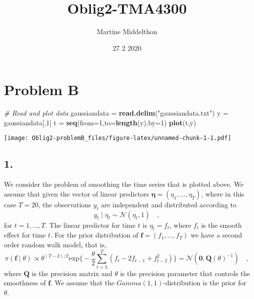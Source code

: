 \documentclass[
]{article}
\title{Oblig2-TMA4300}
\author{Martine Middelthon}
\date{27 2 2020}
\newenvironment{Shaded}{\begin{snugshade}}{\end{snugshade}}
\newcommand{\CommentTok}[1]{\textcolor[rgb]{0.56,0.35,0.01}{\textit{#1}}}
\newcommand{\DataTypeTok}[1]{\textcolor[rgb]{0.13,0.29,0.53}{#1}}
\newcommand{\DecValTok}[1]{\textcolor[rgb]{0.00,0.00,0.81}{#1}}
\newcommand{\KeywordTok}[1]{\textcolor[rgb]{0.13,0.29,0.53}{\textbf{#1}}}
\newcommand{\NormalTok}[1]{#1}
\newcommand{\StringTok}[1]{\textcolor[rgb]{0.31,0.60,0.02}{#1}}
\begin{document}
\maketitle

\hypertarget{problem-b}{%
\section{Problem B}\label{problem-b}}

\begin{Shaded}
\begin{Highlighting}[]
\CommentTok{# Read and plot data}
\NormalTok{gaussiandata =}\StringTok{ }\KeywordTok{read.delim}\NormalTok{(}\StringTok{"gaussiandata.txt"}\NormalTok{)}
\NormalTok{y =}\StringTok{ }\NormalTok{gaussiandata[,}\DecValTok{1}\NormalTok{]}
\NormalTok{t =}\StringTok{ }\KeywordTok{seq}\NormalTok{(}\DataTypeTok{from=}\DecValTok{1}\NormalTok{,}\DataTypeTok{to=}\KeywordTok{length}\NormalTok{(y),}\DataTypeTok{by=}\DecValTok{1}\NormalTok{)}
\KeywordTok{plot}\NormalTok{(t,y)}
\end{Highlighting}
\end{Shaded}

\texttt{[image: Oblig2-problemB\_files/figure-latex/unnamed-chunk-1-1.pdf]}

\hypertarget{section}{%
\subsection{1.}\label{section}}

We consider the problem of smoothing the time series that is plotted
above. We assume that given the vector of linear predictors
\(\boldsymbol\eta=(\eta_1,\ldots,\eta_T)\), where in this case \(T=20\),
the observations \(y_t\) are independent and distributed according to \[
  y_t \mid \eta_t \sim \mathcal{N}(\eta_t,1)\quad,
\] for \(t=1,\ldots,T\). The linear predictor for time \(t\) is
\(\eta_t = f_t\), where \(f_t\) is the smooth effect for time \(t\). For
the prior distribution of \(\mathbf{f}=(f_1,\ldots,f_T)\) we have a
second order random walk model, that is, \[
  \pi(\mathbf{f}\mid\theta) \propto \theta^{(T-2)/2} \text{exp}\Big\{-\frac{\theta}{2} \sum_{t=3}^T (f_t-2f_{t-1}+f_{t-2}^2) \Big\}=\mathcal{N}(\mathbf{0},\mathbf{Q}(\theta)^{-1}) \quad,
\] where \(\mathbf{Q}\) is the precision matrix and \(\theta\) is the
precision parameter that controls the smoothness of \(\mathbf{f}\). We
assume that the \(Gamma(1,1)\)-distribution is the prior for \(\theta\).
\end{document}
